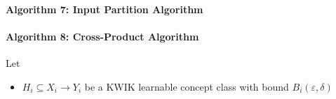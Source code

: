 \paragraph{Algorithm 7: Input Partition Algorithm}
\paragraph{Algorithm 8: Cross-Product Algorithm}
Let
\begin{itemize}
  \item $H_i \subseteq X_i \to Y_i$ be a KWIK learnable concept class with bound $B_i(\varepsilon, \delta)$
\end{itemize}

